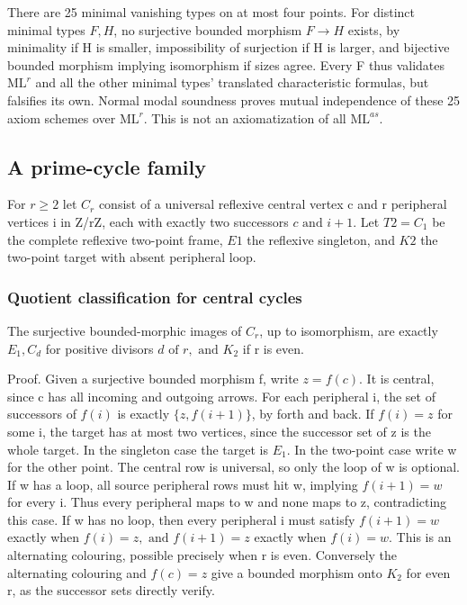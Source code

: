 \documentclass[11pt]{article}
\begin{document}
There are 25 minimal vanishing types on at most four points. For distinct minimal types $F,H$, no surjective bounded morphism $F\to H$ exists, by minimality if H is smaller, impossibility of surjection if H is larger, and bijective bounded morphism implying isomorphism if sizes agree. Every F thus validates $\mathrm{ML}^{r}$ and all the other minimal types' translated characteristic formulas, but falsifies its own. Normal modal soundness proves mutual independence of these 25 axiom schemes over $\mathrm{ML}^{r}$. This is not an axiomatization of all $\mathrm{ML}^{as}$.

\subsection{A prime-cycle family}

For $r\geq 2$ let $C_{r}$ consist of a universal reflexive central vertex c and r peripheral vertices i in Z/rZ, each with exactly two successors $c \text{ and } i+1$. Let $T2=C_{1}$ be the complete reflexive two-point frame, $E1$ the reflexive singleton, and $K2$ the two-point target with absent peripheral loop.

\subsubsection{Quotient classification for central cycles}

The surjective bounded-morphic images of $C_{r}$, up to isomorphism, are exactly $E_{1}, C_{d}$ for positive divisors $d \text{ of } r, \text{ and } K_{2}$ if r is even.

Proof. Given a surjective bounded morphism f, write $z=f(c)$. It is central, since c has all incoming and outgoing arrows. For each peripheral i, the set of successors of $f(i)$ is exactly $\{z,f(i+1)\}$, by forth and back. If $f(i)=z$ for some i, the target has at most two vertices, since the successor set of z is the whole target. In the singleton case the target is $E_{1}$. In the two-point case write w for the other point. The central row is universal, so only the loop of w is optional. If w has a loop, all source peripheral rows must hit w, implying $f(i+1)=w$ for every i. Thus every peripheral maps to w and none maps to z, contradicting this case. If w has no loop, then every peripheral i must satisfy $f(i+1)=w$ exactly when $f(i)=z, \text{ and } f(i+1)=z$ exactly when $f(i)=w$. This is an alternating colouring, possible precisely when r is even. Conversely the alternating colouring and $f(c)=z$ give a bounded morphism onto $K_{2}$ for even r, as the successor sets directly verify.
\end{document}
